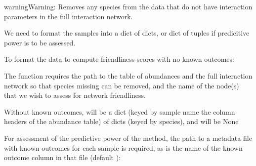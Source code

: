 \documentclass[letterpaper,10pt,english]{sphinxmanual}
\begin{document}
\begin{sphinxadmonition}{warning}{Warning:}
\sphinxAtStartPar
Removes any species from the data that do not have interaction parameters in the full interaction network.
\end{sphinxadmonition}

\sphinxAtStartPar
We need to format the samples into a dict of dicts, or dict of tuples if predicitive power is to be assessed.

\sphinxAtStartPar
To format the data to compute friendliness scores with no known outcomes:

\begin{sphinxVerbatim}[commandchars=\\\{\}]
   

  
\end{sphinxVerbatim}

\sphinxAtStartPar
The function requires the path to the table of abundances and the full interaction network so that species missing can be removed, and the name of the node(s) that we wish to assess for network friendliness.

\sphinxAtStartPar
Without known outcomes,  will be a dict (keyed by sample name \sphinxhyphen{} the column headers of the abundance table)
of dicts (keyed by species), and  will be None

\sphinxAtStartPar
For assessment of the predictive power of the method, the path to a metadata file with known outcomes for each sample is required, as is the name of the known outcome column in that file (default ):

\begin{sphinxVerbatim}[commandchars=\\\{\}]
   

        
\end{sphinxVerbatim}
\end{document}
